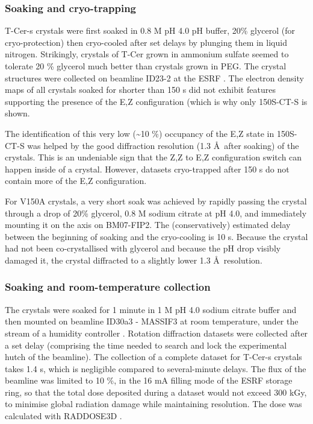 \subsubsection{Soaking and cryo-trapping}

T-Cer-s crystals were first soaked in 0.8 M pH 4.0 pH buffer, 20\% glycerol (for cryo-protection) then cryo-cooled after set delays by plunging them in liquid nitrogen. Strikingly, crystals of T-Cer grown in ammonium sulfate seemed to tolerate 20 \% glycerol much better than crystals grown in PEG. The crystal structures were collected on beamline ID23-2 at the ESRF \parencite{nanaoID232AutomatedHighperformance2022}. The electron density maps of all crystals soaked for shorter than 150 s did not exhibit features supporting the presence of the E,Z configuration (which is why only 150S-CT-S is shown. 

The identification of this very low (\textasciitilde 10 \%) occupancy of the E,Z state in 150S-CT-S was helped by the good diffraction resolution (1.3 \AA\ after soaking) of the crystals. This is an undeniable sign that the Z,Z to E,Z configuration switch can happen inside of a crystal. However, datasets cryo-trapped after 150 s do not contain more of the E,Z configuration. 

For V150A crystals, a very short soak was achieved by rapidly passing the crystal through a drop of 20\% glycerol, 0.8 M sodium citrate at pH 4.0, and immediately mounting it on the axis on BM07-FIP2. The (conservatively) estimated delay between the beginning of soaking and the cryo-cooling is 10 s. Because the crystal had not been co-crystallised with glycerol and because the pH drop visibly damaged it, the crystal diffracted to a slightly lower 1.3 \AA\ resolution. 

\subsubsection{Soaking and room-temperature collection}\label{sec:soaking_protocol}

The crystals were soaked for 1 minute in 1 M pH 4.0 sodium citrate buffer and then mounted on beamline ID30a3 - MASSIF3 \parencite{vonstettenID30A3MASSIF3Beamline2020} at room temperature, under the stream of a humidity controller \parencite{sanchez-weatherbyImprovingDiffractionHumidity2009}. Rotation diffraction datasets were collected after a set delay (comprising the time needed to search and lock the experimental hutch of the beamline). The collection of a complete dataset for T-Cer-s crystals takes 1.4 s, which is negligible compared to several-minute delays. The flux of the beamline was limited to 10 \%, in the 16 mA filling mode of the ESRF storage ring, so that the total dose deposited during a dataset would not exceed 300 kGy, to minimise global radiation damage while maintaining resolution. The dose was calculated with RADDOSE3D \parencite{zeldinRADDOSE3DTimeSpaceresolved2013}.

